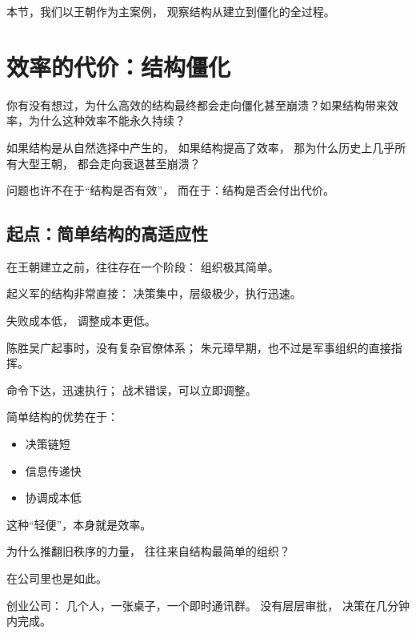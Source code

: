 \documentclass[openany, a4paper, 12pt]{book}
\newenvironment{motivation}{
	\vspace{0.5em}
	\begin{tcolorbox}[
		colback=gray!10,           %
		colframe=gray!60,          %
		title=\textit{本章动机 (Motivation)},
		fonttitle=\bfseries,
		arc=0mm,                   %
		leftrule=3mm               %
		]
		\small \itshape %
	}{
	\end{tcolorbox}
	\vspace{1em}
}
\begin{document}
本节，我们以王朝作为主案例，
观察结构从建立到僵化的全过程。

\section{效率的代价：结构僵化} \label{sec:rigidity}

\begin{readingnote}
	你有没有想过，为什么高效的结构最终都会走向僵化甚至崩溃？如果结构带来效率，为什么这种效率不能永久持续？
\end{readingnote}

\begin{motivation}
	如果结构是从自然选择中产生的，
	如果结构提高了效率，
	那为什么历史上几乎所有大型王朝，
	都会走向衰退甚至崩溃？
	
	问题也许不在于“结构是否有效”，
	而在于：结构是否会付出代价。
\end{motivation}

\subsection{起点：简单结构的高适应性}

在王朝建立之前，往往存在一个阶段：
组织极其简单。

起义军的结构非常直接：
决策集中，层级极少，执行迅速。

失败成本低，
调整成本更低。

\begin{examplebox}
	陈胜吴广起事时，没有复杂官僚体系；
	朱元璋早期，也不过是军事组织的直接指挥。
	
	命令下达，迅速执行；
	战术错误，可以立即调整。
\end{examplebox}

简单结构的优势在于：
\begin{itemize}
	\item 决策链短
	\item 信息传递快
	\item 协调成本低
\end{itemize}

这种“轻便”，本身就是效率。

\begin{questionbox}
	为什么推翻旧秩序的力量，
	往往来自结构最简单的组织？
\end{questionbox}

在公司里也是如此。

创业公司：
几个人，一张桌子，一个即时通讯群。
没有层层审批，
决策在几分钟内完成。
\end{document}
